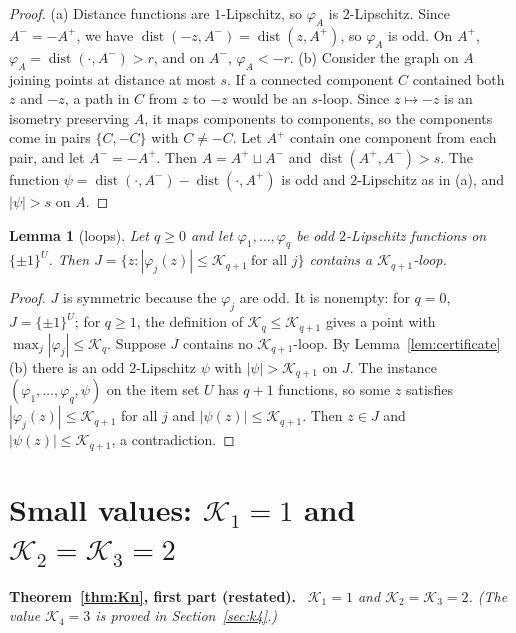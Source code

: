 \documentclass[11pt,letterpaper]{article}
\newtheorem{lemma}[theorem]{Lemma}
\theoremstyle{definition}
\newenvironment{restate}[1]{\par\medskip\noindent\textbf{#1 (restated).}\ \itshape}{\par\medskip}
\newcommand{\cube}[1]{\{\pm1\}^{#1}}
\DeclareMathOperator{\dist}{dist}
\begin{document}
\begin{proof}
(a) Distance functions are $1$-Lipschitz, so $\varphi_A$ is $2$-Lipschitz. Since $A^-=-A^+$, we
have $\dist(-z,A^-)=\dist(z,A^+)$, so $\varphi_A$ is odd. On $A^+$, $\varphi_A=\dist(\cdot,A^-)>r$,
and on $A^-$, $\varphi_A<-r$.
(b) Consider the graph on $A$ joining points at distance at most $s$. If a connected component
$C$ contained both $z$ and $-z$, a path in $C$ from $z$ to $-z$ would be an $s$-loop. Since $z\mapsto
-z$ is an isometry preserving $A$, it maps components to components, so the components come in
pairs $\{C,-C\}$ with $C\ne-C$. Let $A^+$ contain one component from each pair, and let
$A^-=-A^+$. Then $A=A^+\sqcup A^-$ and $\dist(A^+,A^-)>s$. The function
$\psi=\dist(\cdot,A^-)-\dist(\cdot,A^+)$ is odd and $2$-Lipschitz as in (a), and $|\psi|>s$ on
$A$.
\end{proof}

\begin{lemma}[loops]\label{lem:loop}
Let $q\ge0$ and let $\varphi_1,\dots,\varphi_q$ be odd $2$-Lipschitz functions on $\cube U$. Then
$J=\{z:|\varphi_j(z)|\le \mathcal{K}_{q+1}\ \text{for all } j\}$ contains a $\mathcal{K}_{q+1}$-loop.
\end{lemma}

\begin{proof}
$J$ is symmetric because the $\varphi_j$ are odd. It is nonempty: for $q=0$, $J=\cube U$; for
$q\ge1$, the definition of $\mathcal{K}_q\le \mathcal{K}_{q+1}$ gives a point with $\max_j|\varphi_j|\le \mathcal{K}_q$.
Suppose $J$ contains no $\mathcal{K}_{q+1}$-loop. By Lemma~\ref{lem:certificate}(b) there is an odd
$2$-Lipschitz $\psi$ with $|\psi|>\mathcal{K}_{q+1}$ on $J$. The instance $(\varphi_1,\dots,\varphi_q,\psi)$
on the item set $U$ has $q+1$ functions, so some $z$ satisfies $|\varphi_j(z)|\le \mathcal{K}_{q+1}$ for all
$j$ and $|\psi(z)|\le \mathcal{K}_{q+1}$. Then $z\in J$ and $|\psi(z)|\le \mathcal{K}_{q+1}$, a contradiction.
\end{proof}

\section{Small values: \texorpdfstring{$\mathcal{K}_1=1$}{K1=1} and \texorpdfstring{$\mathcal{K}_2=\mathcal{K}_3=2$}{K2=K3=2}}\label{sec:small}

\begin{restate}{Theorem~\ref{thm:Kn}, first part}
$\mathcal{K}_1=1$ and $\mathcal{K}_2=\mathcal{K}_3=2$. (The value $\mathcal{K}_4=3$ is proved in
Section~\ref{sec:k4}.)
\end{restate}
\end{document}
